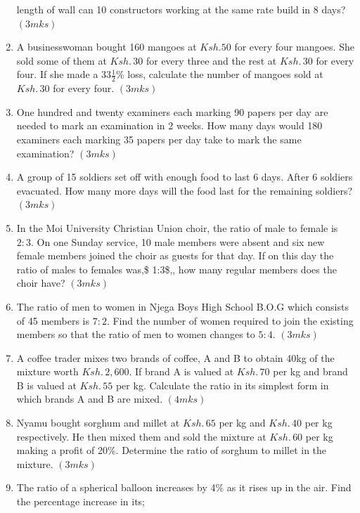 \documentclass[
  a4paperpaper,
]{scrbook}
\begin{document}
\begin{tcolorbox}
\begin{enumerate}
  length of wall can 10 constructors working at the same rate build in 8
  days? \hspace{5.8 cm} \((3mks)\)
\item
  A businesswoman bought 160 mangoes at \(Ksh. 50\) for every four
  mangoes. She sold some of them at \(Ksh. \,30\) for every three and
  the rest at \(Ksh.\, 30\) for every four. If she made a
  33\(\frac{1}{2}\)\% loss, calculate the number of mangoes sold at
  \(Ksh.\, 30\) for every four. \hspace{5 cm} \((3mks)\)
\item
  One hundred and twenty examiners each marking 90 papers per day are
  needed to mark an examination in 2 weeks. How many days would 180
  examiners each marking 35 papers per day take to mark the same
  examination? \hspace{8.2 cm} \((3mks)\)
\item
  A group of 15 soldiers set off with enough food to last 6 days. After
  6 soldiers evacuated. How many more days will the food last for the
  remaining soldiers? \hspace{4 cm} \((3 mks)\)
\item
  In the Moi University Christian Union choir, the ratio of male to
  female is \(2:3\). On one Sunday service, 10 male members were absent
  and six new female members joined the choir as guests for that day. If
  on this day the ratio of males to females was,\$ 1:3\$,, how many
  regular members does the choir have? \hspace{11.8 cm} \((3mks)\)
\item
  The ratio of men to women in Njega Boys High School B.O.G which
  consists of 45 members is \(7: 2\). Find the number of women required
  to join the existing members so that the ratio of men to women changes
  to \(5: 4\). \hspace{10.1cm} \((3mks)\)
\item
  A coffee trader mixes two brands of coffee, A and B to obtain 40kg of
  the mixture worth \(Ksh.\, 2,600\). If brand A is valued at
  \(Ksh.\, 70\) per kg and brand B is valued at \(Ksh.\, 55\) per kg.
  Calculate the ratio in its simplest form in which brands A and B are
  mixed. \hspace{3.7 cm} \((4mks)\)
\item
  Nyamu bought sorghum and millet at \(Ksh.\,65\) per kg and
  \(Ksh.\,40\) per kg respectively. He then mixed them and sold the
  mixture at \(Ksh.\,60\) per kg making a profit of 20\%. Determine the
  ratio of sorghum to millet in the mixture. \hspace{8.5 cm} \((3mks)\)
\item
  The ratio of a spherical balloon increases by 4\% as it rises up in
  the air. Find the percentage increase in its;


\end{enumerate}
\end{tcolorbox}
\end{document}
